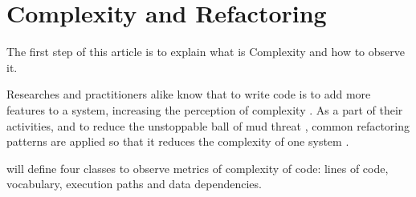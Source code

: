 \section{Complexity and Refactoring}

The first step of this article is to explain what is Complexity and how to observe it.



Researches and practitioners alike know that to write code is to add more features to a system, increasing the
perception of complexity \cite{book:menmonth}. As a part of their activities, and to reduce the unstoppable ball of mud
threat \cite{book:softarch}, common refactoring patterns are applied so that it reduces the complexity of one
system \cite{book:refactoring}.

\cite{article:fmricc} will define four classes to observe metrics of complexity of code: lines of code,
vocabulary, execution paths and data dependencies.

